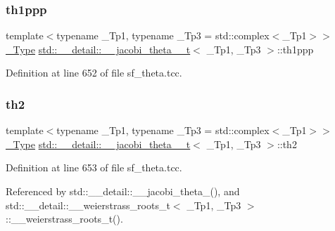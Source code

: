 \subsubsection{\texorpdfstring{th1ppp}{th1ppp}}
{\footnotesize\ttfamily template$<$typename \+\_\+\+Tp1, typename \+\_\+\+Tp3 = std\+::complex$<$\+\_\+\+Tp1$>$$>$ \\
\hyperlink{structstd_1_1____detail_1_1____jacobi__theta__0__t_a4aebcbdd8f3ab416a2fa770aa3784d63}{\+\_\+\+Type} \hyperlink{structstd_1_1____detail_1_1____jacobi__theta__0__t}{std\+::\+\_\+\+\_\+detail\+::\+\_\+\+\_\+jacobi\+\_\+theta\+\_\+\_\+t}$<$ \+\_\+\+Tp1, \+\_\+\+Tp3 $>$\+::th1ppp}



Definition at line 652 of file sf\+\_\+theta.\+tcc.

\mbox{\label{structstd_1_1____detail_1_1____jacobi__theta__0__t_a786aaa2b5a0956b722340fae1eef3535}} 
\subsubsection{\texorpdfstring{th2}{th2}}
{\footnotesize\ttfamily template$<$typename \+\_\+\+Tp1, typename \+\_\+\+Tp3 = std\+::complex$<$\+\_\+\+Tp1$>$$>$ \\
\hyperlink{structstd_1_1____detail_1_1____jacobi__theta__0__t_a4aebcbdd8f3ab416a2fa770aa3784d63}{\+\_\+\+Type} \hyperlink{structstd_1_1____detail_1_1____jacobi__theta__0__t}{std\+::\+\_\+\+\_\+detail\+::\+\_\+\+\_\+jacobi\+\_\+theta\+\_\+\_\+t}$<$ \+\_\+\+Tp1, \+\_\+\+Tp3 $>$\+::th2}



Definition at line 653 of file sf\+\_\+theta.\+tcc.



Referenced by std\+::\+\_\+\+\_\+detail\+::\+\_\+\+\_\+jacobi\+\_\+theta\+\_(), and std\+::\+\_\+\+\_\+detail\+::\+\_\+\+\_\+weierstrass\+\_\+roots\+\_\+t$<$ \+\_\+\+Tp1, \+\_\+\+Tp3 $>$\+::\+\_\+\+\_\+weierstrass\+\_\+roots\+\_\+t().

\mbox{\label{structstd_1_1____detail_1_1____jacobi__theta__0__t_a7ac010328669485a3691e8d764770d24}} 
